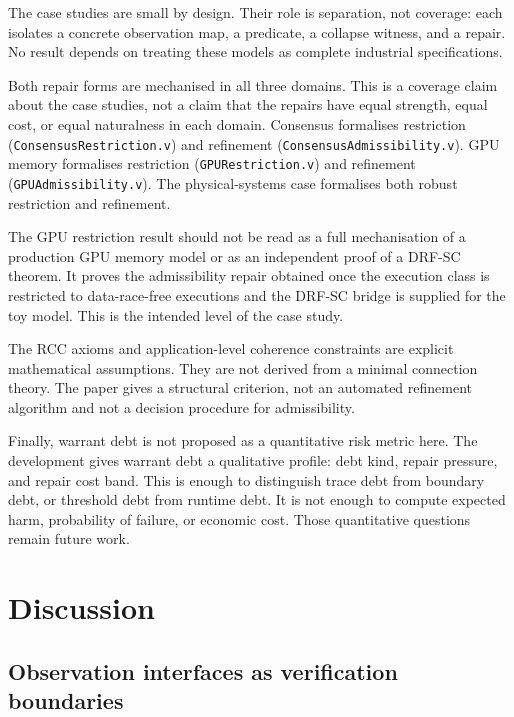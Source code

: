 \documentclass[a4paper,11pt]{article}
\begin{document}
The case studies are small by design. Their role is separation, not coverage:
each isolates a concrete observation map, a predicate, a collapse witness, and
a repair. No result depends on treating these models as complete industrial
specifications.

Both repair forms are mechanised in all three domains. This is a coverage
claim about the case studies, not a claim that the repairs have equal strength,
equal cost, or equal naturalness in each domain. Consensus formalises
restriction (\texttt{ConsensusRestriction.v}) and refinement
(\texttt{ConsensusAdmissibility.v}). GPU memory formalises restriction
(\texttt{GPURestriction.v}) and refinement (\texttt{GPUAdmissibility.v}).
The physical-systems case formalises both robust restriction and refinement.

The GPU restriction result should not be read as a full mechanisation of a
production GPU memory model or as an independent proof of a DRF-SC theorem.
It proves the admissibility repair obtained once the execution class is
restricted to data-race-free executions and the DRF-SC bridge is supplied for
the toy model. This is the intended level of the case study.

The RCC axioms and application-level coherence constraints are explicit
mathematical assumptions. They are not derived from a minimal connection theory.
The paper gives a structural criterion, not an automated refinement algorithm
and not a decision procedure for admissibility.

Finally, warrant debt is not proposed as a quantitative risk metric here.
The development gives warrant debt a qualitative profile: debt kind, repair pressure,
and repair cost band.  This is enough to distinguish trace debt from boundary
debt, or threshold debt from runtime debt.  It is not enough to compute
expected harm, probability of failure, or economic cost.  Those quantitative
questions remain future work.

\section{Discussion}
\label{sec:discussion}

\subsection{Observation interfaces as verification boundaries}
\end{document}

